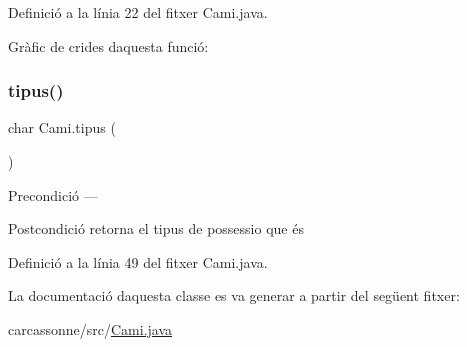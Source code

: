 Definició a la línia 22 del fitxer Cami.\+java.

Gràfic de crides d\textquotesingle{}aquesta funció\+:
\mbox{\label{class_cami_a223743f7fcdcf421994ce0267e95f98e}} 
\subsubsection{\texorpdfstring{tipus()}{tipus()}}
{\footnotesize\ttfamily char Cami.\+tipus (\begin{DoxyParamCaption}{ }\end{DoxyParamCaption})}

\begin{DoxyPrecond}{Precondició}
--- 
\end{DoxyPrecond}
\begin{DoxyPostcond}{Postcondició}
retorna el tipus de possessio que és 
\end{DoxyPostcond}


Definició a la línia 49 del fitxer Cami.\+java.



La documentació d\textquotesingle{}aquesta classe es va generar a partir del següent fitxer\+:\begin{DoxyCompactItemize}
\item 
carcassonne/src/\mbox{\hyperlink{_cami_8java}{Cami.\+java}}\end{DoxyCompactItemize}
